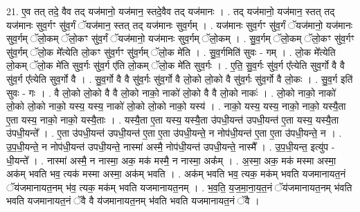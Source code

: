\documentclass[17pt]{extarticle}
\begin{document}
21. ए॒व तत् तदे॒ वैव तद् यज॑मानो॒ यज॑मान॒ स्तदे॒वैव तद् यज॑मानः । . तद् यज॑मानो॒ यज॑मान॒ स्तत् तद् यज॑मानः सुव॒र्गꣳ सु॑व॒र्गं ॅयज॑मान॒ स्तत् तद् यज॑मानः सुव॒र्गम् । . यज॑मानः सुव॒र्गꣳ सु॑व॒र्गं ॅयज॑मानो॒ यज॑मानः सुव॒र्गम् ॅलो॒कम् ॅलो॒कꣳ सु॑व॒र्गं ॅयज॑मानो॒ यज॑मानः सुव॒र्गम् ॅलो॒कम् । . सु॒व॒र्गम् ॅलो॒कम् ॅलो॒कꣳ सु॑व॒र्गꣳ सु॑व॒र्गम् ॅलो॒क मे᳚त्येति लो॒कꣳ सु॑व॒र्गꣳ सु॑व॒र्गम् ॅलो॒क मे॑ति । . सु॒व॒र्गमिति॑ सुवः - गम् । . लो॒क मे᳚त्येति लो॒कम् ॅलो॒क मे॑ति सुव॒र्गः सु॑व॒र्ग ए॑ति लो॒कम् ॅलो॒क मे॑ति सुव॒र्गः । . ए॒ति॒ सु॒व॒र्गः सु॑व॒र्ग ए᳚त्येति सुव॒र्गो वै वै सु॑व॒र्ग ए᳚त्येति सुव॒र्गो वै । . सु॒व॒र्गो वै वै सु॑व॒र्गः सु॑व॒र्गो वै लो॒को लो॒को वै सु॑व॒र्गः सु॑व॒र्गो वै लो॒कः । . सु॒व॒र्ग इति॑ सुवः - गः । . वै लो॒को लो॒को वै वै लो॒को नाको॒ नाको॑ लो॒को वै वै लो॒को नाकः॑ । . लो॒को नाको॒ नाको॑ लो॒को लो॒को नाको॒ यस्य॒ यस्य॒ नाको॑ लो॒को लो॒को नाको॒ यस्य॑ । . नाको॒ यस्य॒ यस्य॒ नाको॒ नाको॒ यस्यै॒ता ए॒ता यस्य॒ नाको॒ नाको॒ यस्यै॒ताः । . यस्यै॒ता ए॒ता यस्य॒ यस्यै॒ता उ॑पधी॒यन्त॑ उपधी॒यन्त॑ ए॒ता यस्य॒ यस्यै॒ता उ॑पधी॒यन्ते᳚ । . ए॒ता उ॑पधी॒यन्त॑ उपधी॒यन्त॑ ए॒ता ए॒ता उ॑पधी॒यन्ते॒ न नोप॑धी॒यन्त॑ ए॒ता ए॒ता उ॑पधी॒यन्ते॒ न । . उ॒प॒धी॒यन्ते॒ न नोप॑धी॒यन्त॑ उपधी॒यन्ते॒ नास्मा॑ अस्मै॒ नोप॑धी॒यन्त॑ उपधी॒यन्ते॒ नास्मै᳚ । . उ॒प॒धी॒यन्त॒ इत्यु॑प - धी॒यन्ते᳚ । . नास्मा॑ अस्मै॒ न नास्मा॒ अक॒ मक॑ मस्मै॒ न नास्मा॒ अक᳚म् । . अ॒स्मा॒ अक॒ मक॑ मस्मा अस्मा॒ अक॑म् भवति भव॒ त्यक॑ मस्मा अस्मा॒ अक॑म् भवति । . अक॑म् भवति भव॒ त्यक॒ मक॑म् भवति यजमानायत॒नं ॅय॑जमानायत॒नम् भ॑व॒ त्यक॒ मक॑म् भवति यजमानायत॒नम् । . भ॒व॒ति॒ य॒ज॒मा॒ना॒य॒त॒नं ॅय॑जमानायत॒नम् भ॑वति भवति यजमानायत॒नं ॅवै वै य॑जमानायत॒नम् भ॑वति भवति यजमानायत॒नं ॅवै । \newline
\end{document}

